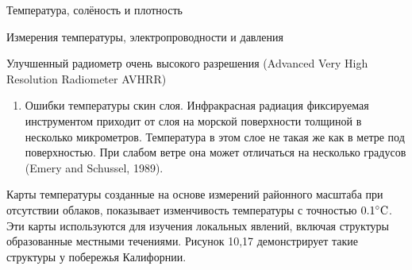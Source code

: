 \begin{chapter}{Температура, солёность и плотность}
\begin{section}{Измерения температуры, электропроводности и давления}
\begin{paragraph}{Улучшенный радиометр очень высокого разрешения (Advanced Very High Resolution Radiometer AVHRR)}
\begin{enumerate}
\item
Ошибки температуры скин слоя. Инфракрасная радиация фиксируемая
инструментом приходит от слоя на морской поверхности толщиной в
несколько микрометров. Температура в этом слое не такая же как в метре
под поверхностью. При слабом ветре она может отличаться на несколько
градусов (Emery and Schussel, 1989).
%
\end{enumerate}

Карты температуры созданные на основе измерений районного масштаба при
отсутствии облаков, показывает изменчивость температуры с точностью
${0.1}^\circ\mbox{C}$. Эти карты используются для изучения локальных
явлений, включая структуры образованные местными течениями. Рисунок
10,17 демонстрирует такие структуры у побережья Калифорнии.
%


\end{paragraph}
\end{section}
\end{chapter}
